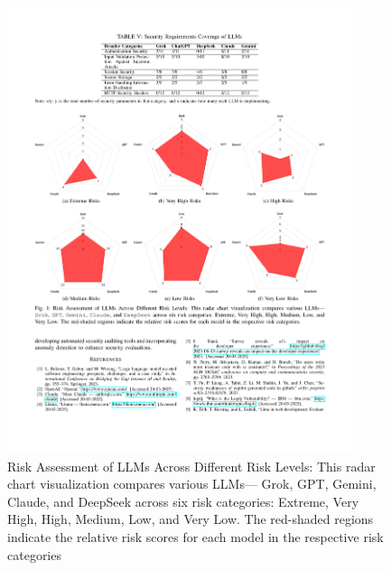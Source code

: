 \begin{figure}[H]
    \centering
    \includegraphics[width=0.9\textwidth]{img/Pagine da 2504.20612v1.pdf}
    \caption{Risk Assessment of LLMs Across Different Risk Levels: This radar chart visualization compares various LLMs—
Grok, GPT, Gemini, Claude, and DeepSeek across six risk categories: Extreme, Very High, High, Medium, Low, and
Very Low. The red-shaded regions indicate the relative risk scores for each model in the respective risk categories}

    \label{fig:security}
\end{figure}